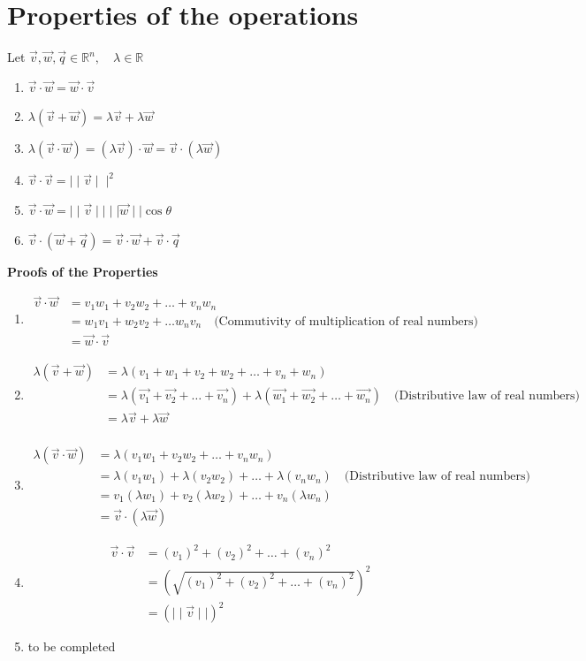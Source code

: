 \documentclass{article}
\begin{document}
\section*{Properties of the operations}
Let \(\vec{v},\vec{w},\vec{q} \in \mathbb{R}^n, \quad \lambda \in \mathbb{R}\)
\begin{enumerate}
\item \(\vec{v}\cdot\vec{w} = \vec{w}\cdot\vec{v} \)
\item \(\lambda(\vec{v}+\vec{w}) = \lambda\vec{v} + \lambda\vec{w}\)
\item \(\lambda(\vec{v}\cdot\vec{w}) = (\lambda\vec{v})\cdot\vec{w} = \vec{v}\cdot(\lambda\vec{w})\)
\item \(\vec{v}\cdot\vec{v} = \mid\mid\vec{v}\mid\mid^2\)
\item \(\vec{v}\cdot\vec{w} = \mid\mid\vec{v}\mid\mid\mid\mid\vec{w}\mid\mid\cos\theta\)
\item \(\vec{v}\cdot(\vec{w} + \vec{q}) = \vec{v}\cdot\vec{w} + \vec{v}\cdot\vec{q}\)
\end{enumerate}
\vspace{5mm}
\textbf{Proofs of the Properties}
\begin{enumerate}
\item \begin{align*}
    \vec{v}\cdot\vec{w} &= v_1w_1+v_2w_2+\dots+v_nw_n \\
    &= w_1v_1 + w_2v_2+\dots w_nv_n \quad \text{(Commutivity of multiplication of real numbers)} \\
    &= \vec{w}\cdot\vec{v}
\end{align*}
\item 
\begin{align*}    
    \lambda(\vec{v}+\vec{w}) &= \lambda(v_1+w_1+v_2+w_2+\dots+v_n+w_n) \\
    &= \lambda(\vec{v_1}+ \vec{v_2}+\dots + \vec{v_n}) + \lambda(\vec{w_1}+ \vec{w_2}+\dots + \vec{w_n}) \quad \text{(Distributive law of real numbers)}\\
    &= \lambda\vec{v} + \lambda\vec{w} \\
\end{align*}
\item \begin{align*}
    \lambda(\vec{v}\cdot\vec{w}) &= \lambda(v_1w_1+v_2w_2+\dots+v_nw_n) \\
    &= \lambda(v_1w_1) + \lambda(v_2w_2) + \dots + \lambda(v_nw_n) \quad \text{(Distributive law of real numbers)} \\
    &= v_1(\lambda w_1) + v_2(\lambda w_2) + \dots + v_n(\lambda w_n) \\
    &= \vec{v}\cdot(\lambda\vec{w})
\end{align*}
\item \begin{align*}
    \vec{v} \cdot \vec{v} &= (v_1)^2 + (v_2)^2 + \dots + (v_n)^2 \\
    &= (\sqrt{(v_1)^2 + (v_2)^2 + \dots + (v_n)^2})^2 \\
    &= (\mid\mid \vec{v} \mid\mid)^2
\end{align*}
\item to be completed
\end{enumerate}
\end{document}
